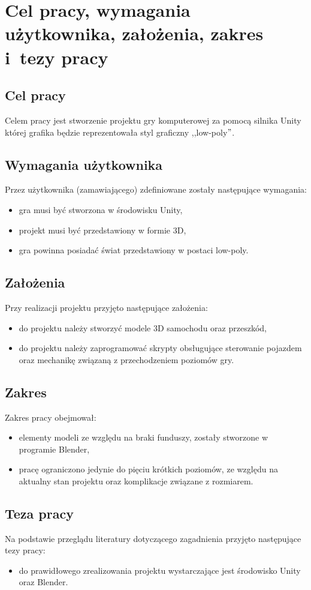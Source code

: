\chapter{Cel pracy, wymagania użytkownika, założenia, zakres i~tezy pracy}
\section{Cel pracy}\label{cel}
Celem pracy jest stworzenie projektu gry komputerowej za pomocą silnika Unity której grafika będzie reprezentowała styl graficzny ,,low-poly$"$.

\section{Wymagania użytkownika}
Przez użytkownika (zamawiającego) zdefiniowane zostały następujące wymagania:
\begin{itemize}
\item gra musi być stworzona w środowisku Unity,
\item projekt musi być przedstawiony w formie 3D,
\item gra powinna posiadać świat przedstawiony w postaci low-poly.
\end{itemize}
\section{Założenia}
Przy realizacji projektu przyjęto następujące założenia:
\begin{itemize}
\item do projektu należy stworzyć modele 3D samochodu oraz przeszkód,
\item do projektu należy zaprogramować skrypty obsługujące sterowanie pojazdem oraz mechanikę związaną z przechodzeniem poziomów gry.
\end{itemize}
\section{Zakres}
Zakres pracy obejmował:
\begin{itemize}
\item elementy modeli ze względu na braki funduszy, zostały stworzone w programie Blender,
\item pracę ograniczono jedynie do pięciu krótkich poziomów, ze względu na aktualny stan projektu oraz komplikacje związane z rozmiarem.
\end{itemize}
\section{Teza pracy}
Na podstawie przeglądu literatury dotyczącego zagadnienia przyjęto następujące tezy pracy:
\begin{itemize}
  \item do prawidłowego zrealizowania projektu wystarczające jest środowisko Unity oraz Blender.
\end{itemize}
